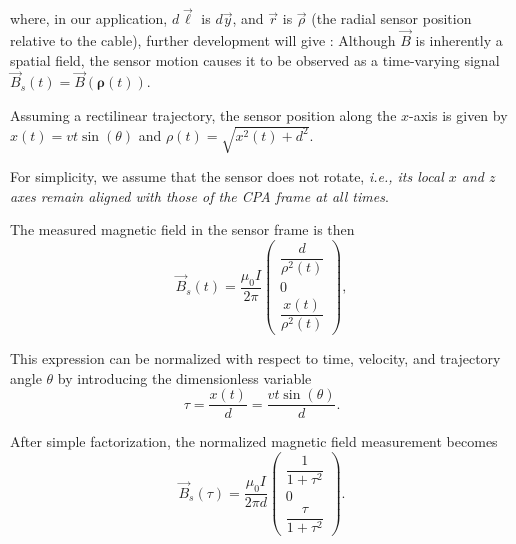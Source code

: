 where, in our application, \(d\vec{\ell}\) is \(d\vec{y}\), and \(\vec{r}\) is \(\vec{\rho}\)   (the radial sensor position relative to the cable), further development will give :
Although \(\vec{B}\) is inherently a spatial field, the sensor motion causes it to be observed as a time-varying signal \(\vec{B}_s(t) = \vec{B}(\mathbf{\rho}(t))\).

Assuming a rectilinear trajectory, the sensor position along the \(x\)-axis is given by
\(
x(t) = v t \sin(\theta)
\)
and $\rho(t) = \sqrt{x^2(t) + d^2}$.

For simplicity, we assume that the sensor does not rotate, \textit{i.e., its local \(x\) and \(z\) axes remain aligned with those of the CPA frame at all times}.

The measured magnetic field in the sensor frame is then
\begin{equation*}
    \vec{B}_s(t) =  \frac{\mu_0 I}{2 \pi} 
    \begin{pmatrix}
        \dfrac{d}{\rho^2(t)} \\[6pt]
        0 \\[6pt]
        \dfrac{x(t)}{\rho^2(t)}
    \end{pmatrix},
\end{equation*}

This expression can be normalized with respect to time, velocity, and trajectory angle \(\theta\) by introducing the dimensionless variable
\[
\tau = \frac{x(t)}{d} = \frac{v t \sin(\theta)}{d}.
\]

After simple factorization, the normalized magnetic field measurement becomes
\begin{equation*}
    \vec{B}_s(\tau) = \frac{\mu_0 I}{2 \pi d}
    \begin{pmatrix}
        \dfrac{1}{1+\tau^2} \\[6pt]
        0 \\[6pt]
        \dfrac{\tau}{1+\tau^2}
    \end{pmatrix}.
\end{equation*}